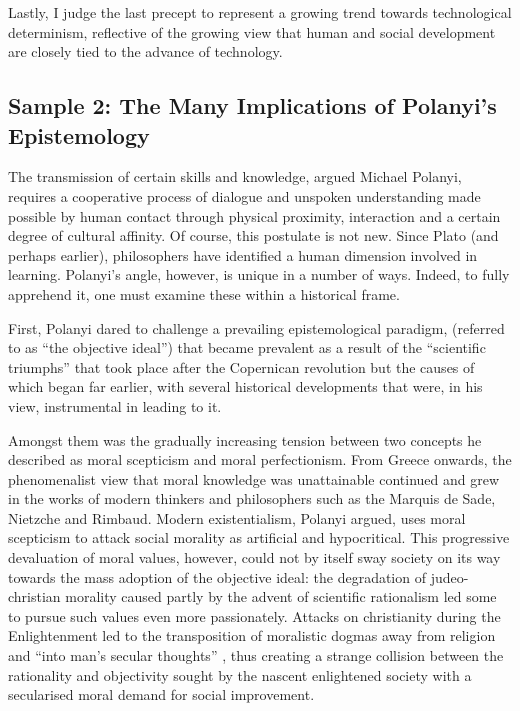 Lastly, I judge the last precept to represent a growing trend towards technological determinism, reflective of the growing view that human and social development are closely tied to the advance of technology. 


\subsection{Sample 2: The Many Implications of Polanyi's Epistemology}
\label{polanyi}

The transmission of certain skills and knowledge, argued Michael Polanyi, requires a cooperative process of dialogue and unspoken understanding made possible by human contact through physical proximity, interaction and a certain degree of cultural affinity. Of course, this postulate is not new. Since Plato (and perhaps earlier), philosophers have identified a human dimension involved in learning. Polanyi's angle, however, is unique in a number of ways. Indeed, to fully apprehend it, one must examine these within a historical frame.

First, Polanyi dared to challenge a prevailing epistemological paradigm, (referred to as ``the objective ideal'') that became prevalent as a result of the ``scientific triumphs'' \citep[p.17]{gelwick77} that took place after the Copernican revolution but the causes of which began far earlier, with several historical developments that were, in his view, instrumental in leading to it.

Amongst them was the gradually increasing tension between two concepts he described as moral scepticism and moral perfectionism. From Greece onwards, the phenomenalist view that moral knowledge was unat\-tainable continued and grew in the works of modern thinkers and philosophers such as the Marquis de Sade, Nietzche and Rimbaud. Modern existentialism, Polanyi argued, uses moral scepticism to attack social morality as artificial and hypocritical. This progressive devaluation of moral values, however, could not by itself sway society on its way towards the mass adoption of the objective ideal: the degradation of judeo-christian morality caused partly by the advent of scientific rationalism led some to pursue such values even more passionately. Attacks on christianity during the Enlightenment led to the transposition of moralistic dogmas away from religion and ``into man's secular thoughts'' \citep[p.57]{polanyi66}, thus creating a strange collision between the rationality and objectivity sought by the nascent enlightened society with a secularised moral demand for social improvement. 

